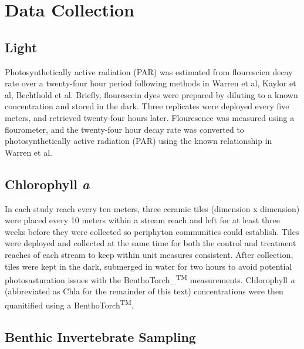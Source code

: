 \documentclass[double,12pt]{beavtex}
\begin{document}
  \section*{Data Collection}\label{data-collection}
  
  \subsection*{Light}\label{light}
  
  Photosynthetically active radiation (PAR) was estimated from flourescien
  decay rate over a twenty-four hour period following methods in Warren et
  al, Kaylor et al, Bechthold et al. Briefly, flourescein dyes were
  prepared by diluting to a known concentration and stored in the dark.
  Three replicates were deployed every five meters, and retrieved
  twenty-four hours later. Flouresence was measured using a flourometer,
  and the twenty-four hour decay rate was converted to photosynthetically
  active radiation (PAR) using the known relationship in Warren et al.
  
  \subsection*{\texorpdfstring{Chlorophyll
  \emph{a}}{Chlorophyll a}}\label{chlorophyll-a}
  
  In each study reach every ten meters, three ceramic tiles (dimension x
  dimension) were placed every 10 meters within a stream reach and left
  for at least three weeks before they were collected so periphyton
  communities could establish. Tiles were deployed and collected at the
  same time for both the control and treatment reaches of each stream to
  keep within unit measures consistent. After collection, tiles were kept
  in the dark, submerged in water for two hours to avoid potential
  photosasturation issues with the BenthoTorch\_\textsuperscript{TM}
  measurements. Chlorophyll \emph{a} (abbreviated as Chla for the
  remainder of this text) concentrations were then quanitified using a
  BenthoTorch\textsuperscript{TM}.
  
  \subsection*{Benthic Invertebrate
  Sampling}\label{benthic-invertebrate-sampling}
  
\end{document}
